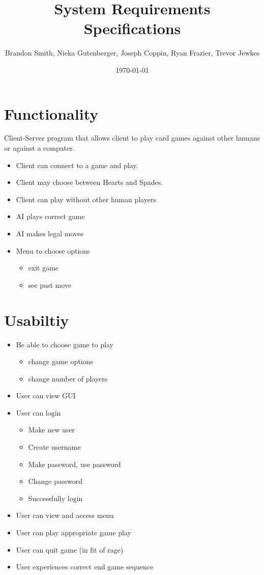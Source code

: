 \documentclass[11pt, titlepage]{article}
\author{Brandon Smith, Nieka Gutenberger, Joseph Coppin, Ryan Frazier, Trevor Jewkes}
\title{System Requirements Specifications}
\date{\today}
\begin{document}
	\maketitle
	\setcounter{tocdepth}{1}
	\section{Functionality}
		Client-Server program that allows client to play card games against other humans or against a computer.
	\begin{itemize}
		\item Client can connect to a game and play.
		\item Client may choose between Hearts and Spades.
		\item Client can play without other human players
		\item AI plays correct game
		\item AI makes legal moves
		\item Menu to choose options
			\begin{itemize}
			\item exit game
			\item see past move
			\end{itemize}
	\end{itemize}
	
	\section{Usabiltiy}
		\begin{itemize}
			\item  Be able to choose game to play
			\begin{itemize}
				\item change game options
				\item change number of players
			\end{itemize}
			\item User can view GUI
			\item User can login
			\begin{itemize}
				\item Make new user
				\item Create username
				\item Make password, use password
				\item Change password
				\item Successfully login 
			\end{itemize}
			\item User can view and access menu
			\item User can play appropriate game play
			\item User can quit game (in fit of rage)
			\item User experiences correct end game sequence
			
		\end{itemize}
\end{document}
